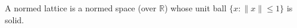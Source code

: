 A normed lattice is a normed space (over $\mathbb{R}$) whose unit ball $\{x : \|x\| \leq 1\}$ is solid.
